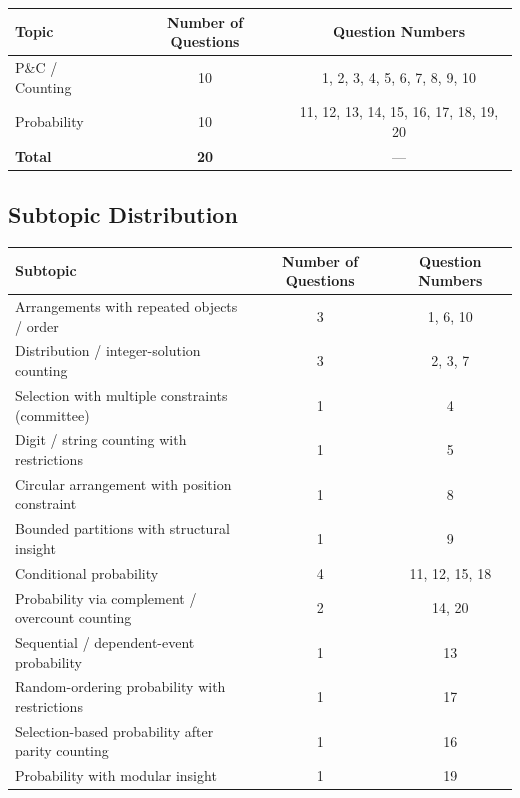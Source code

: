 \documentclass[11pt,a4paper]{article}
\begin{document}
\begin{center}
\renewcommand{\arraystretch}{1.2}
\begin{tabular}{|l|c|c|}
\hline
\textbf{Topic} & \textbf{Number of Questions} & \textbf{Question Numbers} \\
\hline
P\&C / Counting & 10 & 1, 2, 3, 4, 5, 6, 7, 8, 9, 10 \\
Probability     & 10 & 11, 12, 13, 14, 15, 16, 17, 18, 19, 20 \\
\hline
\textbf{Total}  & \textbf{20} & --- \\
\hline
\end{tabular}
\end{center}

\subsection*{Subtopic Distribution}

\begin{center}
\renewcommand{\arraystretch}{1.2}
\begin{tabular}{|l|c|c|}
\hline
\textbf{Subtopic} & \textbf{Number of Questions} & \textbf{Question Numbers} \\
\hline
Arrangements with repeated objects / order        & 3 & 1, 6, 10 \\
Distribution / integer-solution counting          & 3 & 2, 3, 7 \\
Selection with multiple constraints (committee)   & 1 & 4 \\
Digit / string counting with restrictions         & 1 & 5 \\
Circular arrangement with position constraint     & 1 & 8 \\
Bounded partitions with structural insight        & 1 & 9 \\
Conditional probability                           & 4 & 11, 12, 15, 18 \\
Probability via complement / overcount counting   & 2 & 14, 20 \\
Sequential / dependent-event probability          & 1 & 13 \\
Random-ordering probability with restrictions     & 1 & 17 \\
Selection-based probability after parity counting & 1 & 16 \\
Probability with modular insight                  & 1 & 19 \\
\hline
\end{tabular}
\end{center}
\end{document}
